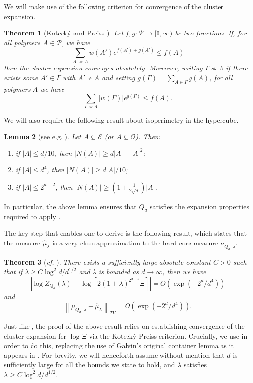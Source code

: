 \documentclass[10pt,a4paper]{amsart}
\newtheorem{thm}{Theorem}[section]
\newtheorem{lem}[thm]{Lemma}
\theoremstyle{definition}
\newcommand{\cO}{\mathcal{O} }
\newcommand{\cE}{\mathcal{E} }
\newcommand{\cP}{\mathcal{P} }
\newcommand{\beq}[1]{\begin{equation}\label{#1}}
\newcommand{\enq}[0]{\end{equation}}
\newcommand{\nin}[0]{\noindent}
\newcommand{\0}[0]{\emptyset}
\newcommand{\lam}{\lambda}
\begin{document}
\nin We will make use of the following criterion for convergence of the cluster expansion.
\begin{thm}[Koteck\'y and Preiss {\cite{kp}}]
    Let $f, g:\cP\rightarrow[0, \infty)$ be two functions. If, for all polymers $A\in\cP$, we have
    \beq{kpcond} \sum_{A'\not\sim A} w(A')e^{f(A')+g(A')} \leq f(A)\enq
    then the cluster expansion converges absolutely. Moreover, writing $\Gamma\not\sim A$ if there exists some $A'\in\Gamma$ with $A'\not\sim A$ and setting $g(\Gamma)=\sum_{A\in\Gamma} g(A)$, for all polymers $A$ we have
    \beq{kpbd} \sum_{\Gamma\not\sim A} |w(\Gamma)|e^{g(\Gamma)}\leq f(A). \enq
\end{thm}

We will also require the following result about isoperimetry in the hypercube.

\begin{lem}[see e.g. \cite{galvin.hom,sapokorcube}]

    Let $A\subseteq \cE$ (or $A\subseteq \cO$). Then:
    \begin{enumerate}
        \item if $|A|\leq d/10$, then $|N(A)|\geq d|A|-|A|^2$;
        \item if $|A|\leq d^4$, then $|N(A)|\geq d|A|/10$;
        \item if $|A|\leq 2^{d-2}$, then $|N(A)|\geq \left( 1+\frac{1}{2\sqrt{d}}\right)|A|$.
    \end{enumerate}
\end{lem}

\nin In particular, the above lemma ensures that $Q_d$ satisfies the expansion properties required to apply .

The key step that enables one to derive  is the following result, which states that the measure $\hat{\mu}_\lam$ is a very close approximation to the hard-core measure $\mu_{Q_d,\lam}$.

\begin{thm}[\textit{cf.} {\cite[Lemma 14]{hypercube}}]\label{clusterapprox}
    There exists a sufficiently large absolute constant $C>0$ such that if $\lam\geq C\log^2 d/d^{1/2}$ and $\lam$ is bounded as $d\rightarrow\infty$, then we have
    \[ \left| \log Z_{Q_d}(\lam) -\log \left[ 2(1+\lam)^{2^{d-1}}\Xi\right]\right| = O\left(\exp(-2^d/d^4)\right)\]
  and
    \beq{tvbd} \left\|\mu_{Q_d,\lam}-\hat{\mu}_\lam \right\|_{TV}=O\left(\exp(-2^d/d^4)\right). \enq
\end{thm}

Just like \cite[Lemma 14]{hypercube}, the proof of the above result relies on establishing convergence of the cluster expansion for $\log \Xi$ via the Koteck\'y-Preiss criterion. Crucially, we use  in order to do this, replacing the use of Galvin's original container lemma as it appears in \cite{hypercube}. For brevity, we will henceforth assume without mention that $d$ is sufficiently large for all the bounds we state to hold, and $\lam$ satisfies $\lam\geq C\log^2 d/d^{1/2}$.
\end{document}
